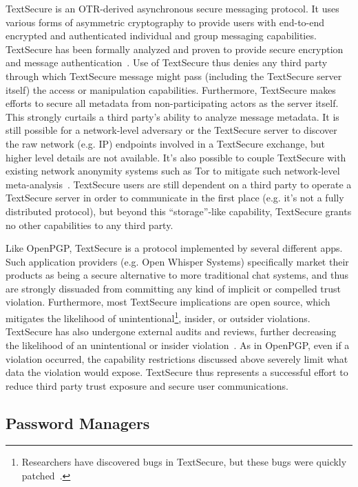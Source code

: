 TextSecure is an OTR-derived asynchronous secure messaging
protocol. It uses various forms of asymmetric cryptography to provide
users with end-to-end encrypted and authenticated individual and group
messaging capabilities. TextSecure has been formally analyzed and
proven to provide secure encryption and message
authentication~\cite{frosch2014}. Use of TextSecure thus denies any
third party through which TextSecure message might pass (including the
TextSecure server itself) the access or manipulation
capabilities. Furthermore, TextSecure makes efforts to secure all
metadata from non-participating actors as the server itself. This
strongly curtails a third party's ability to analyze message
metadata. It is still possible for a network-level adversary or the
TextSecure server to discover the raw network (e.g. IP) endpoints
involved in a TextSecure exchange, but higher level details are not
available. It's also possible to couple TextSecure with existing
network anonymity systems such as Tor to mitigate such network-level
meta-analysis~\cite{intercept-chatting}. TextSecure users are still
dependent on a third party to operate a TextSecure server in order to
communicate in the first place (e.g. it's not a fully distributed
protocol), but beyond this ``storage''-like capability, TextSecure
grants no other capabilities to any third party.

Like OpenPGP, TextSecure is a protocol implemented by several
different apps. Such application providers (e.g. Open Whisper Systems)
specifically market their products as being a secure alternative to
more traditional chat systems, and thus are strongly dissuaded from
committing any kind of implicit or compelled trust
violation. Furthermore, most TextSecure implications are open source,
which mitigates the likelihood of unintentional\footnote{Researchers
  have discovered bugs in TextSecure, but these bugs were quickly
  patched~\cite{frosch2014}.}, insider, or outsider
violations. TextSecure has also undergone external audits and reviews,
further decreasing the likelihood of an unintentional or insider
violation~\cite{frosch2014}. As in OpenPGP, even if a violation
occurred, the capability restrictions discussed above severely limit
what data the violation would expose. TextSecure thus represents a
successful effort to reduce third party trust exposure and secure user
communications.

\subsection{Password Managers}

